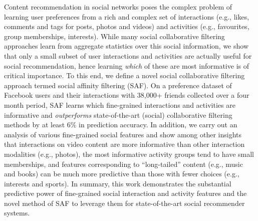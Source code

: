 %

Content recommendation in social networks poses the complex problem of
learning user preferences from a rich and complex set of interactions
(e.g., likes, comments and tags for posts, photos and videos) and
activities (e.g., favourites, group memberships, interests).  While
many social collaborative filtering approaches learn from aggregate
statistics over this social information, we show that only a small
subset of user interactions and activities are actually useful for
social recommendation, hence learning \emph{which} of these are most
informative is of critical importance.  To this end, we define a
novel social collaborative filtering approach termed social affinity
filtering (SAF).  
On a preference dataset of Facebook users and their 
interactions with 38,000+ friends collected over a four month period, 
SAF learns which fine-grained interactions and
activities are informative and \emph{outperforms} state-of-the-art
(social) collaborative filtering methods by at least 6\% in prediction
accuracy.
In addition, we carry out an analysis of various fine-grained social
features and show among other insights that interactions
on video content are more informative than other interaction
modalities (e.g., photos), the most informative activity groups tend
to have small memberships, and features corresponding to
``long-tailed'' content (e.g., music and books) can be much more
predictive than those with fewer choices (e.g., interests and sports).
In summary, this work demonstrates the substantial predictive power of
fine-grained social interaction and activity features and the novel
method of SAF to leverage them for state-of-the-art social recommender
systems.

